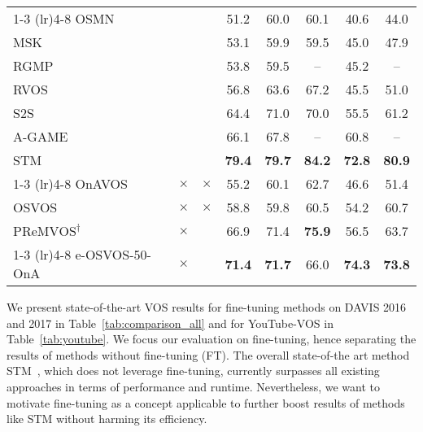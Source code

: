 \documentclass{article}
\begin{document}
\begin{table*}
{\begin{tabular}[t]{lcc ccccc }
        \cmidrule(r){1-3} \cmidrule(lr){4-8}
OSMN~\cite{osmn}                  & & & 51.2 &60.0 &60.1 &40.6 &44.0 \\
        MSK~\cite{msk}                  & & & 53.1 & 59.9 & 59.5 & 45.0 & 47.9 \\
        RGMP~\cite{oh2018fast}                  & & & 53.8 & 59.5 & -- & 45.2 & -- \\
        RVOS~\cite{rvos}             & & & 56.8 & 63.6 & 67.2 & 45.5 & 51.0  \\
        S2S~\cite{s2s}                          & & & 64.4 & 71.0 & 70.0 & 55.5 & 61.2 \\
        A-GAME~\cite{agame}                & & & 66.1 & 67.8 & -- & 60.8 & -- \\
        STM~\cite{STM_19}                       & & & \textbf{79.4} & \textbf{79.7} & \textbf{84.2} & \textbf{72.8} & \textbf{80.9}  \\
\cmidrule(r){1-3} \cmidrule(lr){4-8}
OnAVOS~\cite{onavos}                                                &$\times$ &$\times$ & 55.2 & 60.1 & 62.7 & 46.6 & 51.4  \\
OSVOS~\cite{OSVOS}                                                &$\times$ &$\times$ & 58.8  & 59.8  & 60.5  & 54.2 & 60.7  \\
$\textrm{PReMVOS}^{\dagger}$~\cite{luiten2018premvos}   &$\times$ & & 66.9 & 71.4  & \textbf{75.9} & 56.5 & 63.7 \\

        \cmidrule(r){1-3} \cmidrule(lr){4-8}
e-OSVOS-50-OnA                     & $\times$ & & \textbf{71.4} & \textbf{71.7}  & 66.0 & \textbf{74.3} & \textbf{73.8} \\
        \bottomrule
    \end{tabular}
    }
\label{tab:youtube}
\end{table*} 
    We present state-of-the-art VOS results for fine-tuning methods on DAVIS 2016 and 2017 in Table~\ref{tab:comparison_all} and for YouTube-VOS in Table~\ref{tab:youtube}.
We focus our evaluation on fine-tuning, hence separating the results of methods without fine-tuning (FT).
The overall state-of-the art method STM~\cite{STM_19}, which does not leverage fine-tuning, currently surpasses all existing approaches in terms of performance and runtime.
Nevertheless, we want to motivate fine-tuning as a concept applicable to further boost results of methods like STM without harming its efficiency.
\end{document}
